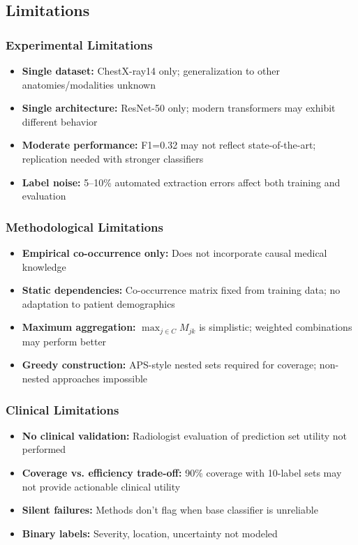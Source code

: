 \subsection{Limitations}

\subsubsection{Experimental Limitations}

\begin{itemize}
    \item \textbf{Single dataset:} ChestX-ray14 only; generalization to other anatomies/modalities unknown
    \item \textbf{Single architecture:} ResNet-50 only; modern transformers may exhibit different behavior
    \item \textbf{Moderate performance:} F1=0.32 may not reflect state-of-the-art; replication needed with stronger classifiers
    \item \textbf{Label noise:} 5--10\% automated extraction errors affect both training and evaluation
\end{itemize}

\subsubsection{Methodological Limitations}

\begin{itemize}
    \item \textbf{Empirical co-occurrence only:} Does not incorporate causal medical knowledge
    \item \textbf{Static dependencies:} Co-occurrence matrix fixed from training data; no adaptation to patient demographics
    \item \textbf{Maximum aggregation:} $\max_{j \in C} M_{jk}$ is simplistic; weighted combinations may perform better
    \item \textbf{Greedy construction:} APS-style nested sets required for coverage; non-nested approaches impossible
\end{itemize}

\subsubsection{Clinical Limitations}

\begin{itemize}
    \item \textbf{No clinical validation:} Radiologist evaluation of prediction set utility not performed
    \item \textbf{Coverage vs. efficiency trade-off:} 90\% coverage with 10-label sets may not provide actionable clinical utility
    \item \textbf{Silent failures:} Methods don't flag when base classifier is unreliable
    \item \textbf{Binary labels:} Severity, location, uncertainty not modeled
\end{itemize}

